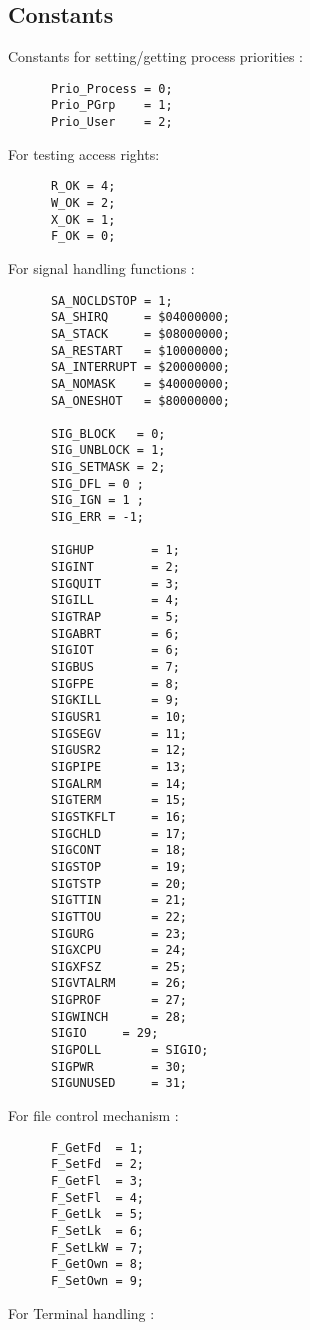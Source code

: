 \subsection{Constants}
Constants for setting/getting process priorities :
\begin{verbatim}
      Prio_Process = 0;
      Prio_PGrp    = 1;
      Prio_User    = 2;
\end{verbatim}
For testing  access rights:
\begin{verbatim}
      R_OK = 4; 
      W_OK = 2;
      X_OK = 1;
      F_OK = 0;
\end{verbatim}
For signal handling functions :
\begin{verbatim}
      SA_NOCLDSTOP = 1;
      SA_SHIRQ	   = $04000000;
      SA_STACK	   = $08000000;      
      SA_RESTART   = $10000000;
      SA_INTERRUPT = $20000000;
      SA_NOMASK	   = $40000000;
      SA_ONESHOT   = $80000000;
      
      SIG_BLOCK	  = 0;
      SIG_UNBLOCK = 1;
      SIG_SETMASK = 2;
      SIG_DFL = 0 ;
      SIG_IGN = 1 ;
      SIG_ERR = -1;
      
      SIGHUP		= 1;
      SIGINT		= 2;
      SIGQUIT		= 3;
      SIGILL		= 4;
      SIGTRAP		= 5;
      SIGABRT		= 6;
      SIGIOT		= 6;
      SIGBUS		= 7;
      SIGFPE		= 8;
      SIGKILL		= 9;
      SIGUSR1		= 10;
      SIGSEGV		= 11;
      SIGUSR2		= 12;
      SIGPIPE		= 13;
      SIGALRM		= 14;
      SIGTERM		= 15;
      SIGSTKFLT		= 16;
      SIGCHLD		= 17;
      SIGCONT		= 18;
      SIGSTOP		= 19;
      SIGTSTP		= 20;
      SIGTTIN		= 21;
      SIGTTOU		= 22;
      SIGURG		= 23;
      SIGXCPU		= 24;
      SIGXFSZ		= 25;
      SIGVTALRM		= 26;
      SIGPROF		= 27;
      SIGWINCH		= 28;
      SIGIO		= 29;
      SIGPOLL		= SIGIO;
      SIGPWR		= 30;
      SIGUNUSED		= 31;
\end{verbatim}
For file control mechanism :
\begin{verbatim}
      F_GetFd  = 1;
      F_SetFd  = 2;
      F_GetFl  = 3;
      F_SetFl  = 4;
      F_GetLk  = 5;
      F_SetLk  = 6;
      F_SetLkW = 7;
      F_GetOwn = 8;
      F_SetOwn = 9;
\end{verbatim}
For Terminal handling :
